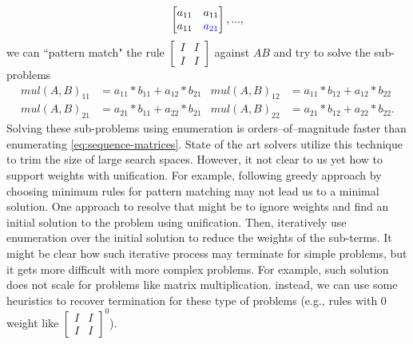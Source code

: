 \begin{description}
\begin{equation}
\begin{bmatrix} a_{11} & a_{11} \\ a_{11} & \textcolor{blue}{a_{21}} \end{bmatrix},
...,
\label{eq:sequence-matrices}
\end{equation}
%
we can ``pattern match" the rule $\begin{bmatrix} I & I \\ I & I \end{bmatrix}$ against $AB$ and try to solve the sub-problems
%
\begin{align*}
    mul(A,B)_{11} &= a_{11} * b_{11} + a_{12} * b_{21} &
    mul(A,B)_{12} &= a_{11} * b_{12} + a_{12} * b_{22} \\
    mul(A,B)_{21} &= a_{21} * b_{11} + a_{22} * b_{21} &
    mul(A,B)_{22} &= a_{21} * b_{12} + a_{22} * b_{22}. 
\end{align*}
%
Solving these sub-problems using enumeration is orders--of--magnitude faster than enumerating \eqref{eq:sequence-matrices}.
%
State of the art solvers utilize this technique to trim the size of large search spaces.
%
However, it not clear to us yet how to support weights with unification. 
%
For example, following greedy approach by choosing minimum rules for pattern matching may not lead us to a minimal solution. 
%
One approach to resolve that might be to ignore weights and find an initial solution to the problem using unification.
%
Then, iteratively use enumeration over the initial solution to reduce the weights of the sub-terms.
%
It might be clear how such iterative process may terminate for simple problems,
%
but it gets more difficult with more complex problems. 
%
For example, such solution does not scale for problems like matrix multiplication.
%
instead, we can use some heuristics to recover termination for these type of problems (e.g., rules with 0 weight like $\begin{bmatrix} I & I \\ I & I \end{bmatrix}^0$).
\end{description}